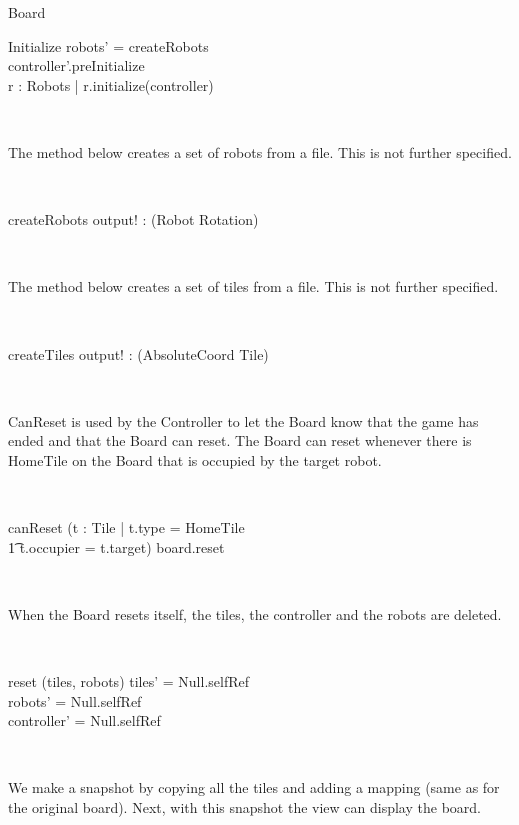 \documentclass[12pt]{article}
\begin{document}
\begin{class}{Board}
\begin{schema}{Initialize}
robots' = createRobots \\
controller'.preInitialize \\
\forall r : \dom Robots | r.initialize(controller)
\end{schema} \\
\begin{classcom}
The method below creates a set of robots from a file. This is not further specified.
\end{classcom} \\
\begin{schema}{createRobots}
output! : \power (Robot \fun Rotation)
\end{schema} \\
\begin{classcom}
The method below creates a set of tiles from a file. This is not further specified.
\end{classcom} \\
\begin{schema}{createTiles}
output! : \power (AbsoluteCoord \fun Tile)
\end{schema} \\
\begin{classcom}
CanReset is used by the Controller to let the Board know that the game has ended and that the Board can reset. The Board can reset whenever there is HomeTile on the Board that is occupied by the target robot.
\end{classcom} \\
\begin{schema}{canReset}
\where
(\exists t : Tile | t.type = HomeTile \\ \t1
t.occupier = t.target) \Rightarrow board.reset
\end{schema} \\
\begin{classcom}
When the Board resets itself, the tiles, the controller and the robots are deleted.
\end{classcom} \\
\begin{schema}{reset}
\Delta (tiles, robots)
\where
tiles' = Null.selfRef \\
robots' = Null.selfRef \\
controller' = Null.selfRef
\end{schema} \\
\znewpage
\begin{classcom}
We make a snapshot by copying all the tiles and adding a mapping (same as for the original board). Next, with this snapshot the view can display the board.

\end{classcom}
\end{class}
\end{document}
